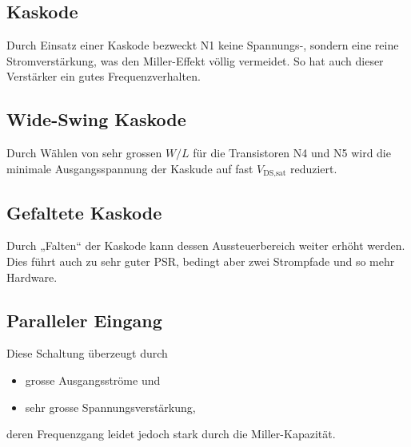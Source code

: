 \subsection{Kaskode}

Durch Einsatz einer Kaskode bezweckt N1 keine Spannungs-, sondern eine reine Stromverstärkung, was den Miller-Effekt völlig vermeidet.
So hat auch dieser Verstärker ein gutes Frequenzverhalten.

\subsection{Wide-Swing Kaskode}

Durch Wählen von sehr grossen $W/L$ für die Transistoren N4 und N5 wird die minimale Ausgangsspannung der Kaskude auf fast $V_\text{DS,sat}$ reduziert.

\subsection{Gefaltete Kaskode}

Durch „Falten“ der Kaskode kann dessen Aussteuerbereich weiter erhöht werden.
Dies führt auch zu sehr guter PSR, bedingt aber zwei Strompfade und so mehr Hardware.

\subsection{Paralleler Eingang}

Diese Schaltung überzeugt durch
\begin{itemize}
    \item grosse Ausgangsströme und
    \item sehr grosse Spannungsverstärkung,
\end{itemize}
deren Frequenzgang leidet jedoch stark durch die Miller-Kapazität.
